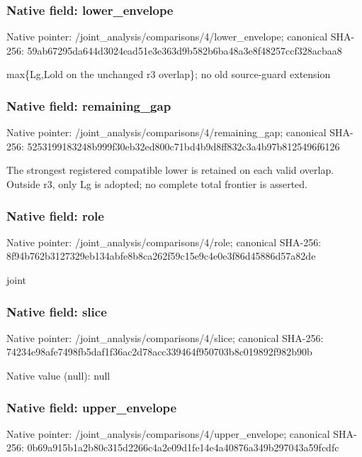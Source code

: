 \documentclass[10pt,a4paper]{article}
\begin{document}
\subsubsection{Native field: lower\_\allowbreak{}envelope}
Native pointer: /joint\_\allowbreak{}analysis/comparisons/4/lower\_\allowbreak{}envelope; canonical SHA-256: 59ab67295da644d3024ead51e3e363d9b582b6ba48a3e8f48257ccf328acbaa8

\begingroup\raggedright\sloppy max\{Lg,\allowbreak{}Lold on the unchanged r3 overlap\};\allowbreak{} no old source-guard extension\par\endgroup

\subsubsection{Native field: remaining\_\allowbreak{}gap}
Native pointer: /joint\_\allowbreak{}analysis/comparisons/4/remaining\_\allowbreak{}gap; canonical SHA-256: 5253199183248b999f30eb32ed800c71bd4b9d8ff832c3a4b97b8125496f6126

\begingroup\raggedright\sloppy The strongest registered compatible lower is retained on each valid overlap. Outside r3,\allowbreak{} only Lg is adopted;\allowbreak{} no complete total frontier is asserted.\par\endgroup

\subsubsection{Native field: role}
Native pointer: /joint\_\allowbreak{}analysis/comparisons/4/role; canonical SHA-256: 8f94b762b3127329eb134abfe8b8ca262f59c15e9c4e0e3f86d45886d57a82de

\begingroup\raggedright\sloppy joint\par\endgroup

\subsubsection{Native field: slice}
Native pointer: /joint\_\allowbreak{}analysis/comparisons/4/slice; canonical SHA-256: 74234e98afe7498fb5daf1f36ac2d78acc339464f950703b8c019892f982b90b

Native value (null): null

\subsubsection{Native field: upper\_\allowbreak{}envelope}
Native pointer: /joint\_\allowbreak{}analysis/comparisons/4/upper\_\allowbreak{}envelope; canonical SHA-256: 0b69a915b1a2b80c315d2266c4a2e09d1fe14e4a40876a349b297043a59fcdfc
\end{document}
